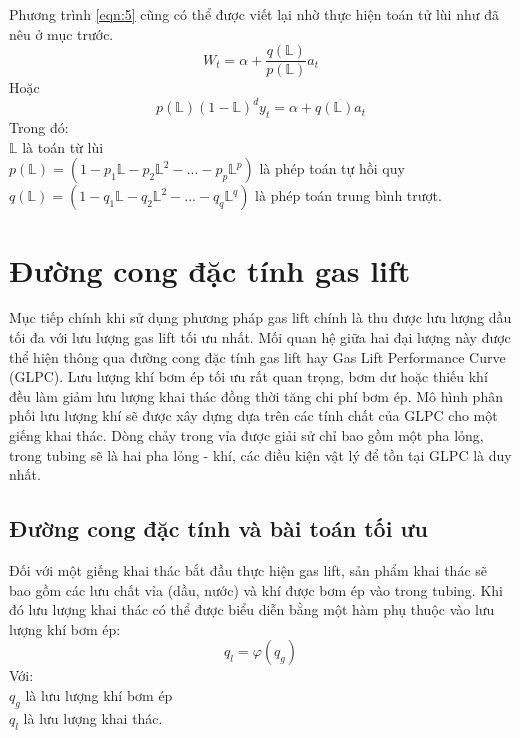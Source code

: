 \documentclass[12pt,a4paper]{report}
\begin{document}
Phương trình \ref{eqn:5} cũng có thể được viết lại nhờ thực hiện toán tử lùi như đã nêu ở mục trước.
	\begin{equation}
		W_t = \alpha + \dfrac{q(\mathbb{L})}{p(\mathbb{L})}a_t
	\end{equation}
Hoặc
	\begin{equation}
		p(\mathbb{L})(1 - \mathbb{L})^d y_t = \alpha + q(\mathbb{L}) a_t
	\end{equation}
Trong đó:\\
\hspace*{1cm}$\mathbb{L}$ là toán từ lùi\\
\hspace*{1cm}$p(\mathbb{L}) = (1 - p_1\mathbb{L} - p_2\mathbb{L}^2 - ... - p_p\mathbb{L}^p)$ là phép toán tự hồi quy\\
\hspace*{1cm}$q(\mathbb{L}) = (1 - q_1\mathbb{L} - q_2\mathbb{L}^2 - ... - q_q\mathbb{L}^q)$ là phép toán trung bình trượt.



\section{Đường cong đặc tính gas lift}
Mục tiếp chính khi sử dụng phương pháp gas lift chính là thu được lưu lượng dầu tối đa với lưu lượng gas lift tối ưu nhất. Mối quan hệ giữa hai đại lượng này được thể hiện thông qua đường cong đặc tính gas lift hay Gas Lift Performance Curve (GLPC). Lưu lượng khí bơm ép tối ưu rất quan trọng, bơm dư hoặc thiếu khí đều làm giảm lưu lượng khai thác đồng thời tăng chi phí bơm ép. Mô hình phân phối lưu lượng khí sẽ được xây dựng dựa trên các tính chất của GLPC cho một giếng khai thác. Dòng chảy trong vỉa được giải sử chỉ bao gồm một pha lỏng, trong tubing sẽ là hai pha lỏng - khí, các điều kiện vật lý để tồn tại GLPC là duy nhất.\\

\subsection{Đường cong đặc tính và bài toán tối ưu}\label{glpc-opt-problem}
Đối với một giếng khai thác bắt đầu thực hiện gas lift, sản phẩm khai thác sẽ bao gồm các lưu chất vỉa (dầu, nước) và khí được bơm ép vào trong tubing. Khi đó lưu lượng khai thác có thể được biểu diễn bằng một hàm phụ thuộc vào lưu lượng khí bơm ép:
	\begin{equation}\label{eqn:GLPC}
		q_l = \varphi(q_g)
	\end{equation}
Với:\\
\hspace*{1cm}$q_g$ là lưu lượng khí bơm ép\\
\hspace*{1cm}$q_l$ là lưu lượng khai thác.
\end{document}
